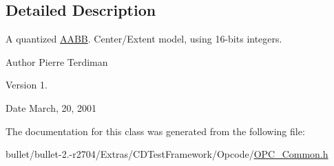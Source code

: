 \subsection{Detailed Description}
A quantized \hyperlink{class_a_a_b_b}{A\+A\+B\+B}. Center/\+Extent model, using 16-\/bits integers.

\begin{DoxyAuthor}{Author}
Pierre Terdiman 
\end{DoxyAuthor}
\begin{DoxyVersion}{Version}
1. 
\end{DoxyVersion}
\begin{DoxyDate}{Date}
March, 20, 2001 
\end{DoxyDate}


The documentation for this class was generated from the following file\+:\begin{DoxyCompactItemize}
\item 
bullet/bullet-\/2.-\/r2704/\+Extras/\+C\+D\+Test\+Framework/\+Opcode/\hyperlink{_o_p_c___common_8h}{O\+P\+C\+\_\+\+Common.\+h}\end{DoxyCompactItemize}
